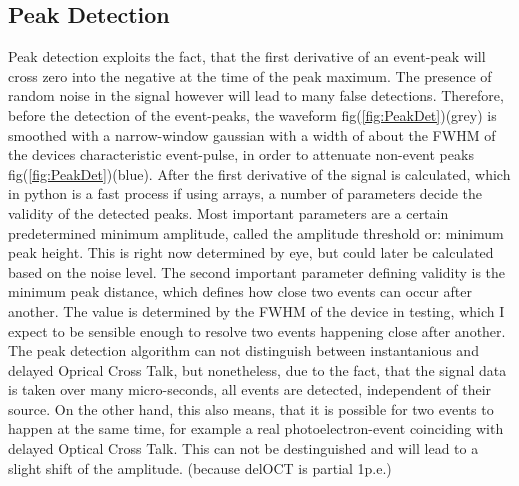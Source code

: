 \documentclass[12pt,article,type=msc,colorback,accentcolor=tud9c]{tudthesis}
\begin{document}
\clearpage
\subsection{Peak Detection}
\begin{wrapfigure}{R}{0.5\textwidth}
\centering
\texttt{[image: D:/OwnCloudData/00\_WriteUp/04\_Thesis/Pic/Analysis/\{HAM\_T22.0\_Vb68.5.trcFiltered2Zoom]}.pdf}
\caption{\label{fig:PeakDet}Peak Detection}
\end{wrapfigure}
Peak detection exploits the fact, that the first derivative of an event-peak will cross zero into the negative at the time of the peak maximum. The presence of random noise in the signal however will lead to many false detections. Therefore, before the detection of the event-peaks, the waveform fig(\ref{fig:PeakDet})(grey) is smoothed with a narrow-window gaussian with a width of about the FWHM of the devices characteristic event-pulse, in order to attenuate non-event peaks fig(\ref{fig:PeakDet})(blue). After the first derivative of the signal is calculated, which in python is a fast process if using arrays, a number of parameters decide the validity of the detected peaks. Most important parameters are a certain predetermined minimum amplitude, called the amplitude threshold or: minimum peak height. This is right now determined by eye, but could later be calculated based on the noise level. The second important parameter defining validity is the minimum peak distance, which defines how close two events can occur after another. The value is determined by the FWHM of the device in testing, which I expect to be sensible enough to resolve two events happening close after another. The peak detection algorithm can not distinguish between instantanious and delayed Oprical Cross Talk, but nonetheless, due to the fact, that the signal data is taken over many micro-seconds, all events are detected, independent of their source. On the other hand, this also means, that it is possible for two events to happen at the same time, for example a real photoelectron-event coinciding with delayed Optical Cross Talk. This can not be destinguished and will lead to a slight shift of the amplitude. (because delOCT is partial 1p.e.)   

\clearpage
\end{document}
